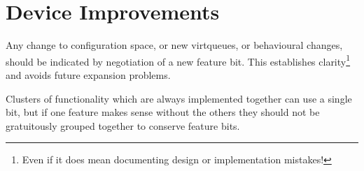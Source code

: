 \section{Device Improvements}\label{sec:Creating New Device Types / Device Improvements}

Any change to configuration space, or new virtqueues, or
behavioural changes, should be indicated by negotiation of a new
feature bit. This establishes clarity\footnote{Even if it does mean documenting design or implementation
mistakes!
} and avoids future expansion problems.

Clusters of functionality which are always implemented together
can use a single bit, but if one feature makes sense without the
others they should not be gratuitously grouped together to
conserve feature bits.


